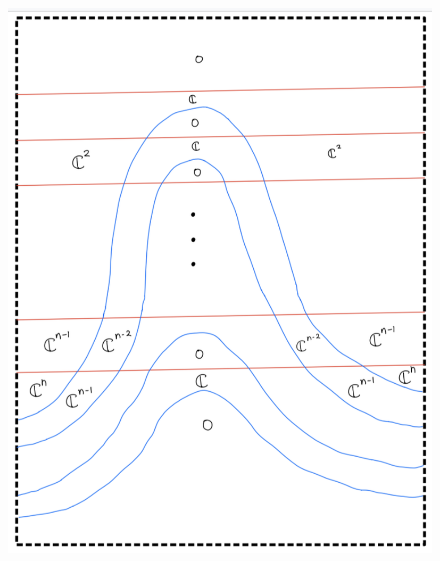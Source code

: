 \begin{figure}[H]
    \centering
    \includegraphics[scale = 0.95]{diagrams/cobord_inter/1.png}
    \caption{}
    \label{fig:your-label}
\end{figure} 

